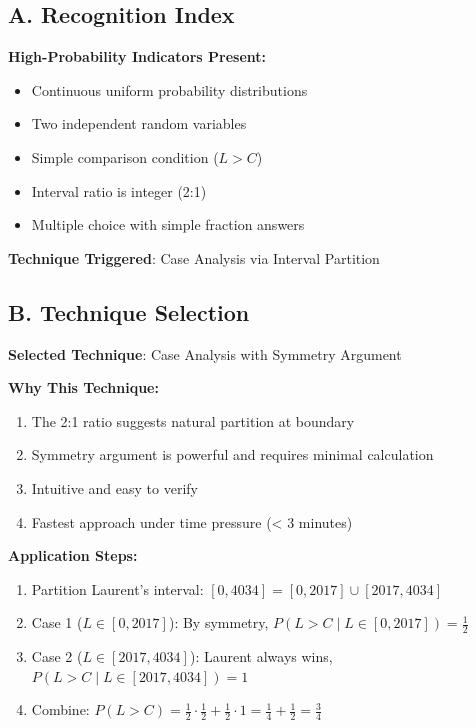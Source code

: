 \documentclass[]{article}
\begin{document}
\begin{techniquesbox}
\subsection*{A. Recognition Index}
\textbf{High-Probability Indicators Present:}
\begin{itemize}[leftmargin=*]
    \item[$\checkmark$] Continuous uniform probability distributions
    \item[$\checkmark$] Two independent random variables
    \item[$\checkmark$] Simple comparison condition ($L > C$)
    \item[$\checkmark$] Interval ratio is integer (2:1)
    \item[$\checkmark$] Multiple choice with simple fraction answers
\end{itemize}

\textbf{Technique Triggered}: Case Analysis via Interval Partition

\subsection*{B. Technique Selection}
\textbf{Selected Technique}: Case Analysis with Symmetry Argument

\textbf{Why This Technique:}
\begin{enumerate}
    \item The 2:1 ratio suggests natural partition at boundary
    \item Symmetry argument is powerful and requires minimal calculation
    \item Intuitive and easy to verify
    \item Fastest approach under time pressure (< 3 minutes)
\end{enumerate}

\textbf{Application Steps:}
\begin{enumerate}
    \item Partition Laurent's interval: $[0, 4034] = [0, 2017] \cup [2017, 4034]$
    \item Case 1 ($L \in [0, 2017]$): By symmetry, $P(L > C \mid L \in [0,2017]) = \frac{1}{2}$
    \item Case 2 ($L \in [2017, 4034]$): Laurent always wins, $P(L > C \mid L \in [2017,4034]) = 1$
    \item Combine: $P(L > C) = \frac{1}{2} \cdot \frac{1}{2} + \frac{1}{2} \cdot 1 = \frac{1}{4} + \frac{1}{2} = \frac{3}{4}$
\end{enumerate}


\end{techniquesbox}
\end{document}
